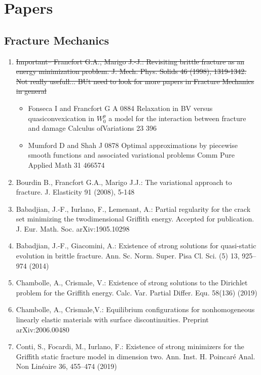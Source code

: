 \section{Papers}
\subsection{Fracture Mechanics}
\begin{enumerate}
       \item \sout{Important-- Francfort G.A., Marigo J.-J.: Revisiting brittle fracture as an energy minimization problem. J. Mech.
Phys. Solids 46 (1998), 1319-1342. Not really usefull... BUt need to look for more papers in Fracture Mechanics in general}
\begin{itemize}
\item Fonseca I and Francfort G A 0884 Relaxation in BV versus quasiconvexication in $W_0^p$
a model for the interaction between fracture and damage Calculus ofVariations 23 396
\item Mumford D and Shah J 0878 Optimal approximations by piecewise smooth functions and associated variational problems Comm Pure Applied Math 31 466574
\end{itemize}
\item Bourdin B., Francfort G.A., Marigo J.J.: The variational approach to fracture. J. Elasticity 91 (2008),
5-148
\item Babadjian, J.-F., Iurlano, F., Lemenant, A.: Partial regularity for the crack set minimizing the twodimensional Griffith energy. Accepted for publication. J. Eur. Math. Soc. arXiv:1905.10298
\item Babadjian, J.-F., Giacomini, A.: Existence of strong solutions for quasi-static evolution in brittle fracture.
Ann. Sc. Norm. Super. Pisa Cl. Sci. (5) 13, 925–974 (2014)
\item Chambolle, A., Crismale, V.: Existence of strong solutions to the Dirichlet problem for the Griffith energy. Calc. Var. Partial Differ. Equ. 58(136) (2019)
\item Chambolle, A., Crismale,V.: Equilibrium configurations for nonhomogeneous linearly elastic materials with surface discontinuities. Preprint arXiv:2006.00480
\item  Conti, S., Focardi, M., Iurlano, F.: Existence of strong minimizers for the Griffith static fracture model in dimension two. Ann. Inst. H. Poincaré Anal. Non Linéaire 36, 455–474 (2019)


\end{enumerate}
